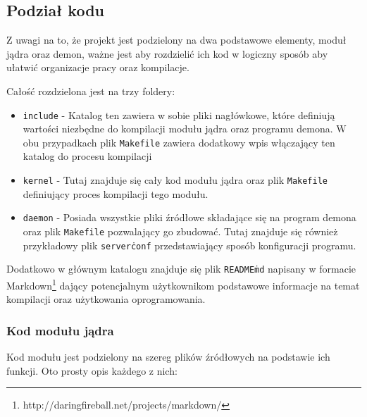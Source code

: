 \documentclass[10pt]{article}
\begin{document}
\subsection{Podział kodu}

Z uwagi na to, że projekt jest podzielony na dwa podstawowe elementy, moduł jądra oraz demon, ważne jest aby rozdzielić ich kod w logiczny sposób aby ułatwić organizacje pracy oraz kompilacje.

Całość rozdzielona jest na trzy foldery:

\begin{itemize}
\itemsep1pt\parskip0pt
\item
  \texttt{include} - Katalog ten zawiera w sobie pliki nagłówkowe, które definiują wartości niezbędne do kompilacji modułu jądra oraz programu demona. W obu przypadkach plik \texttt{Makefile} zawiera dodatkowy wpis włączający ten katalog do procesu kompilacji
\item
  \texttt{kernel} - Tutaj znajduje się cały kod modułu jądra oraz plik
  \texttt{Makefile} definiujący proces kompilacji tego modułu.
\item
  \texttt{daemon} - Posiada wszystkie pliki źródłowe składające się na program demona oraz plik \texttt{Makefile} pozwalający go zbudować.  Tutaj znajduje się również przykładowy plik \texttt{server\.conf} przedstawiający sposób konfiguracji programu.
\end{itemize}

Dodatkowo w głównym katalogu znajduje się plik \texttt{README\.md} napisany w formacie Markdown\footnote{http://daringfireball.net/projects/markdown/} dający potencjalnym użytkownikom podstawowe informacje na temat kompilacji oraz użytkowania oprogramowania.

\subsubsection{Kod modułu jądra}

Kod modułu jest podzielony na szereg plików źródłowych na podstawie ich funkcji. Oto prosty opis każdego z nich:
\end{document}
